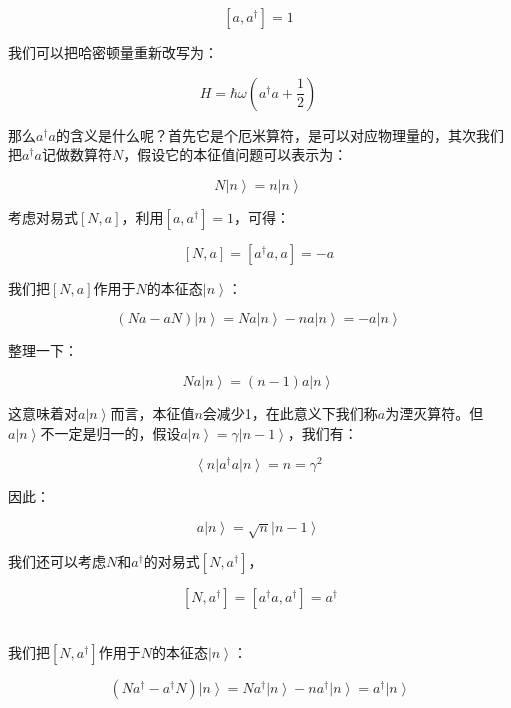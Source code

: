 \begin{equation}
\left[ a, a^\dagger  \right] = 1~
\end{equation}

我们可以把哈密顿量重新改写为：

\begin{equation}
H = \hbar \omega \left( a^\dagger a + \frac{1}{2} \right)~
\end{equation}

那么$a^\dagger a$的含义是什么呢？首先它是个厄米算符，是可以对应物理量的，其次我们把$a^\dagger a$记做数算符$N$，假设它的本征值问题可以表示为：

\begin{equation}
N \left| n \right\rangle = n \left| n \right\rangle~
\end{equation}

考虑对易式$\left[ N, a \right]$，利用$\left[ a, a^\dagger \right] = 1$，可得：

\begin{equation}
\left[ N, a \right]  = \left[ a^\dagger a , a \right] = - a~
\end{equation}

我们把$\left[ N, a \right] $作用于$N$的本征态$\left| n \right\rangle$：

\begin{equation}
\left( N a - a N \right) \left| n \right\rangle = N a \left| n \right\rangle - n a \left| n \right\rangle = - a \left| n \right\rangle~
\end{equation}

整理一下：

\begin{equation}
N a \left| n \right\rangle = (n -1) a \left| n \right\rangle~
\end{equation}

这意味着对$a \left| n \right\rangle$而言，本征值$n$会减少1，在此意义下我们称$a$为湮灭算符。但$a \left| n \right\rangle$不一定是归一的，假设$a \left| n \right\rangle = \gamma \left| n -1 \right\rangle$，我们有：

\begin{equation}
\left\langle n \right| a^\dagger a \left| n \right\rangle = n = \gamma^2~
\end{equation}

因此：

\begin{equation}
a \left| n \right\rangle = \sqrt{n} \left| n -1 \right\rangle~
\end{equation}

我们还可以考虑$N$和$a^\dagger$的对易式$\left[ N, a^\dagger \right]$，

\begin{equation}
\left[ N, a^\dagger \right] = \left[ a^\dagger a , a^\dagger \right] = a^\dagger
\end{equation}~

我们把$\left[ N, a^\dagger \right] $作用于$N$的本征态$\left| n \right\rangle$：

\begin{equation}
\left( N a^\dagger - a^\dagger N \right) \left| n \right\rangle =   N a^\dagger \left| n \right\rangle - n a^\dagger \left| n \right\rangle = a^\dagger \left| n \right\rangle 
\end{equation}